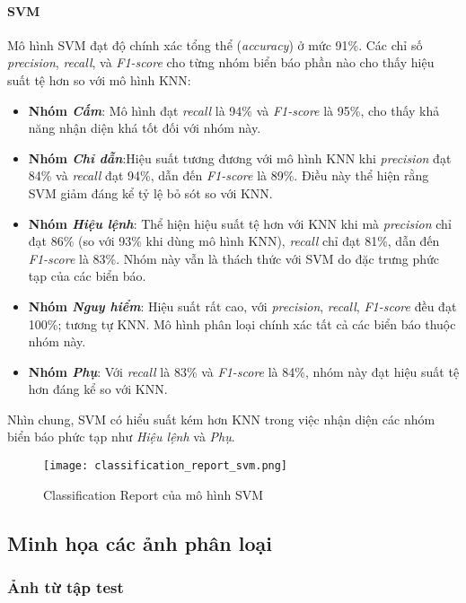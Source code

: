 \documentclass[a4paper,12pt]{article}
\begin{document}
\paragraph{SVM}
Mô hình SVM đạt độ chính xác tổng thể (\textit{accuracy}) ở mức 91\%. Các chỉ số \textit{precision}, \textit{recall}, và \textit{F1-score} cho từng nhóm biển báo phần nào cho thấy hiệu suất tệ hơn so với mô hình KNN:
\begin{itemize} \item \textbf{Nhóm \textit{Cấm}}: Mô hình đạt \textit{recall} là 94\% và \textit{F1-score} là 95\%, cho thấy khả năng nhận diện khá tốt đối với nhóm này.
\item \textbf{Nhóm \textit{Chỉ dẫn}}:Hiệu suất tương đương với mô hình KNN khi \textit{precision} đạt 84\% và \textit{recall} đạt 94\%, dẫn đến \textit{F1-score} là 89\%. Điều này thể hiện rằng SVM giảm đáng kể tỷ lệ bỏ sót so với KNN.
\item \textbf{Nhóm \textit{Hiệu lệnh}}: Thể hiện hiệu suất tệ hơn với KNN khi mà \textit{precision} chỉ đạt 86\% (so với 93\% khi dùng mô hình KNN), \textit{recall} chỉ đạt 81\%, dẫn đến \textit{F1-score} là 83\%. Nhóm này vẫn là thách thức với SVM do đặc trưng phức tạp của các biển báo.
\item \textbf{Nhóm \textit{Nguy hiểm}}: Hiệu suất rất cao, với \textit{precision}, \textit{recall}, \textit{F1-score} đều đạt 100\%; tương tự KNN. Mô hình phân loại chính xác tất cả các biển báo thuộc nhóm này.
\item \textbf{Nhóm \textit{Phụ}}: Với \textit{recall} là 83\% và \textit{F1-score} là 84\%, nhóm này đạt hiệu suất tệ hơn đáng kể so với KNN.
\end{itemize}

Nhìn chung, SVM có hiểu suất kém hơn KNN trong việc nhận diện các nhóm biển báo phức tạp như \textit{Hiệu lệnh} và \textit{Phụ}.

\begin{figure}[H]
    \centering
    \texttt{[image: classification\_report\_svm.png]}
    \caption{Classification Report của mô hình SVM}
    \label{fig:svm_classification_report}
\end{figure}

\newpage
\subsection{Minh họa các ảnh phân loại}

\subsubsection{Ảnh từ tập test}
\end{document}
